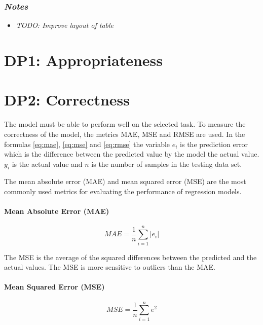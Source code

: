 \subsubsection*{\textit{Notes}}

\begin{itemize}
    \item \textit{TODO: Improve layout of table}
\end{itemize}


\section{DP1: Appropriateness}


\section{DP2: Correctness}
The model must be able to perform well on the selected task.
To measure the correctness of the model, the metrics MAE, MSE and RMSE are used.
In the formulas \ref{eq:mae}, \ref{eq:mse} and \ref{eq:rmse} the variable $e_i$ is the prediction
error which is the difference between the predicted value by the model the actual value.
$y_i$ is the actual value and $n$ is the number of samples in the testing data set.

The mean absolute error (MAE) and mean squared error (MSE) are the most commonly used metrics for
evaluating the performance of regression models. \paragraph*{Mean Absolute Error (MAE)}

\begin{equation}
    \label{eq:mae}
    MAE = \frac{1}{n} \sum_{i=1}^{n} |e_i|
\end{equation}

The MSE is the average of the squared differences between the predicted and the actual values.
The MSE is more sensitive to outliers than the MAE.

\paragraph*{Mean Squared Error (MSE)}

\begin{equation}
    \label{eq:mse}
    MSE = \frac{1}{n} \sum_{i=1}^{n} e^2
\end{equation}

